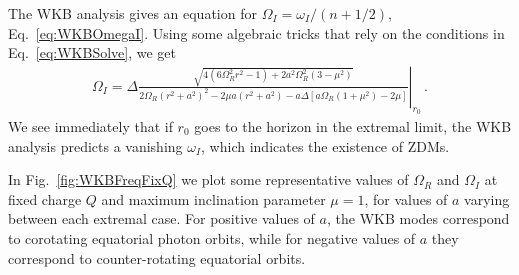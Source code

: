 \begin{refsection}
The WKB analysis gives an equation for $\Omega_I = \omega_I/(n+1/2)$, Eq.~\eqref{eq:WKBOmegaI}.
Using some algebraic tricks that rely on the conditions in Eq.~\eqref{eq:WKBSolve}, we get
\begin{align}
\Omega_I = \left. \Delta\frac{\sqrt{ 4(6 \Omega_R^2 r^2 -1) + 2 a^2 \Omega_R^2(3-\mu^2) }}{2 \Omega_R(r^2+a^2)^2 - 2\mu a (r^2 +a^2) -a \Delta [a \Omega_R (1+\mu^2) - 2 \mu] } \right|_{r_0} \,.
\end{align}
We see immediately that if $r_0$ goes to the horizon in the extremal limit, the WKB analysis predicts a vanishing $\omega_I$, which indicates the existence of ZDMs. 

In Fig.~\ref{fig:WKBFreqFixQ} we plot some representative values of $\Omega_R$ and $\Omega_I$ at fixed charge $Q$ and maximum inclination parameter $\mu = 1$, for values of $a$ varying between each extremal case. For positive values of $a$, the WKB modes correspond to corotating equatorial photon orbits, while for negative values of $a$ they correspond to counter-rotating equatorial orbits.


\printbibliography[heading=subbibliography]
\end{refsection}